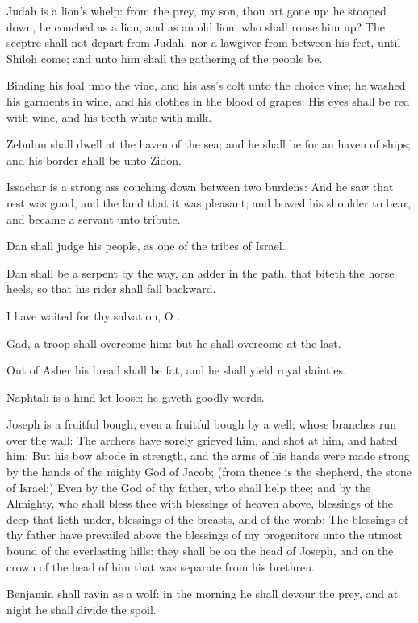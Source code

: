 \verse Judah is a lion's whelp: from the prey, my son, thou art gone up: he stooped down, he couched as a lion, and as an old lion; who shall rouse him up?  \verse The sceptre shall not depart from Judah, nor a lawgiver from between his feet, until Shiloh come; and unto him shall the gathering of the people be.

\verse Binding his foal unto the vine, and his ass's colt unto the choice vine; he washed his garments in wine, and his clothes in the blood of grapes: \verse His eyes shall be red with wine, and his teeth white with milk.

\verse Zebulun shall dwell at the haven of the sea; and he shall be for an haven of ships; and his border shall be unto Zidon.

\verse Issachar is a strong ass couching down between two burdens: \verse And he saw that rest was good, and the land that it was pleasant; and bowed his shoulder to bear, and became a servant unto tribute.

\verse Dan shall judge his people, as one of the tribes of Israel.

\verse Dan shall be a serpent by the way, an adder in the path, that biteth the horse heels, so that his rider shall fall backward.

\verse I have waited for thy salvation, O \LORD.

\verse Gad, a troop shall overcome him: but he shall overcome at the last.

\verse Out of Asher his bread shall be fat, and he shall yield royal dainties.

\verse Naphtali is a hind let loose: he giveth goodly words.

\verse Joseph is a fruitful bough, even a fruitful bough by a well; whose branches run over the wall: \verse The archers have sorely grieved him, and shot at him, and hated him: \verse But his bow abode in strength, and the arms of his hands were made strong by the hands of the mighty God of Jacob; (from thence is the shepherd, the stone of Israel:) \verse Even by the God of thy father, who shall help thee; and by the Almighty, who shall bless thee with blessings of heaven above, blessings of the deep that lieth under, blessings of the breasts, and of the womb: \verse The blessings of thy father have prevailed above the blessings of my progenitors unto the utmost bound of the everlasting hills: they shall be on the head of Joseph, and on the crown of the head of him that was separate from his brethren.

\verse Benjamin shall ravin as a wolf: in the morning he shall devour the prey, and at night he shall divide the spoil.

